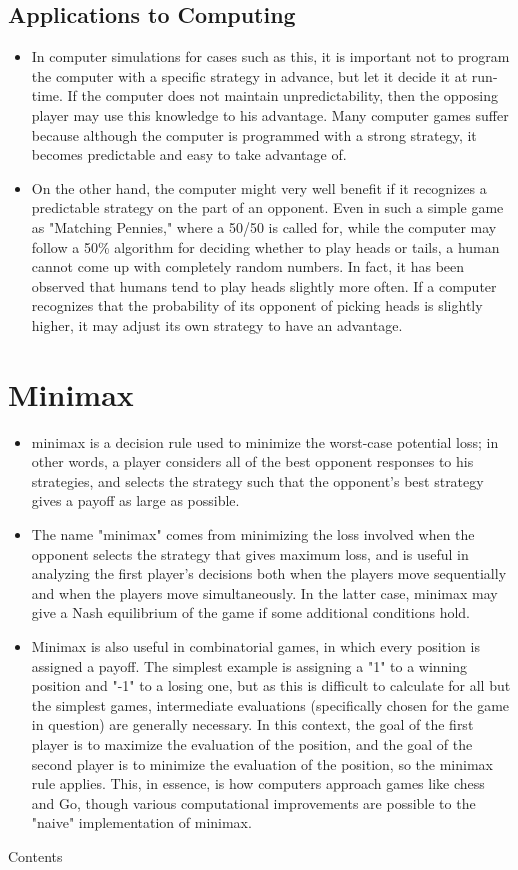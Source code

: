 \documentclass[a4paper,12pt]{article}
\begin{document}
\subsection{Applications to Computing}
\begin{itemize}
\item In computer simulations for cases such as this, it is important not to program the computer with a specific strategy in advance, but let it decide it at run-time. If the computer does not maintain unpredictability, then the opposing player may use this knowledge to his advantage. Many computer games suffer because although the computer is programmed with a strong strategy, it becomes predictable and easy to take advantage of.
\item 
On the other hand, the computer might very well benefit if it recognizes a predictable strategy on the part of an opponent. Even in such a simple game as "Matching Pennies," where a 50/50 is called for, while the computer may follow a 50\% algorithm for deciding whether to play heads or tails, a human cannot come up with completely random numbers. In fact, it has been observed that humans tend to play heads slightly more often. If a computer recognizes that the probability of its opponent of picking heads is slightly higher, it may adjust its own strategy to have an advantage.
\end{itemize}
\newpage
\section{Minimax}
\begin{itemize}
\item minimax is a decision rule used to minimize the worst-case potential loss; in other words, a player considers all of the best opponent responses to his strategies, and selects the strategy such that the opponent's best strategy gives a payoff as large as possible.
\item 
The name "minimax" comes from minimizing the loss involved when the opponent selects the strategy that gives maximum loss, and is useful in analyzing the first player's decisions both when the players move sequentially and when the players move simultaneously. In the latter case, minimax may give a Nash equilibrium of the game if some additional conditions hold.
\item 
Minimax is also useful in combinatorial games, in which every position is assigned a payoff. The simplest example is assigning a "1" to a winning position and "-1" to a losing one, but as this is difficult to calculate for all but the simplest games, intermediate evaluations (specifically chosen for the game in question) are generally necessary. In this context, the goal of the first player is to maximize the evaluation of the position, and the goal of the second player is to minimize the evaluation of the position, so the minimax rule applies. This, in essence, is how computers approach games like chess and Go, though various computational improvements are possible to the "naive" implementation of minimax.
\end{itemize}
Contents
\end{document}
